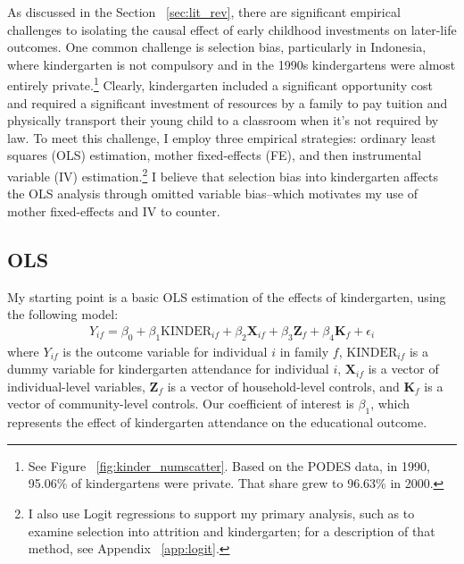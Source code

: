 As discussed in the Section ~\ref{sec:lit_rev}, there are significant empirical challenges to isolating the causal effect of early childhood investments on later-life outcomes. One common challenge is selection bias, particularly in Indonesia, where kindergarten is not compulsory and in the 1990s kindergartens were almost entirely private.\footnote{See Figure ~\ref{fig:kinder_numscatter}. Based on the PODES data, in 1990, 95.06\% of kindergartens were private. That share grew to 96.63\% in 2000.} Clearly, kindergarten included a significant opportunity cost and required a significant investment of resources by a family to pay tuition and physically transport their young child to a classroom when it’s not required by law. To meet this challenge, I employ three empirical strategies: ordinary least squares (OLS) estimation, mother fixed-effects (FE), and then instrumental variable (IV) estimation.\footnote{I also use Logit regressions to support my primary analysis, such as to examine selection into attrition and kindergarten; for a description of that method, see Appendix ~\ref{app:logit}.} I believe that selection bias into kindergarten affects the OLS analysis through omitted variable bias--which motivates my use of mother fixed-effects and IV to counter.

\subsection{OLS}
My starting point is a basic OLS estimation of the effects of kindergarten, using the following model:
\begin{gather}
	Y_{if} = \beta_0 + \beta_1\text{KINDER}_{if} + \beta_2\mathbf{X}_{if} + \beta_3\mathbf{Z}_f + \beta_4\mathbf{K}_f + \epsilon_i
\end{gather}
where $Y_{if}$ is the outcome variable for individual $i$ in family $f$, $\text{KINDER}_{if}$ is a dummy variable for kindergarten attendance for individual $i$, $\mathbf{X}_{if}$ is a vector of individual-level variables, $\mathbf{Z}_f$ is a vector of household-level controls, and $\mathbf{K}_f$ is a vector of community-level controls. Our coefficient of interest is $\beta_1$, which represents the effect of kindergarten attendance on the educational outcome.

